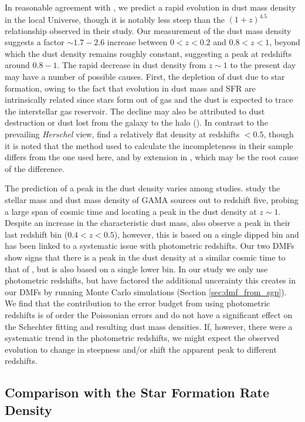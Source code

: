 In reasonable agreement with \citealt{Dunne_2011}, we predict a rapid evolution in dust mass density in the local Universe, though it is notably less steep than the $(1+z)^{4.5}$ relationship observed in their study. Our measurement of the dust mass density suggests a factor $\sim 1.7 - 2.6$ increase between $0 < z < 0.2$ and $0.8 < z < 1$, beyond which the dust density remains roughly constant, suggesting a peak at redshifts around $0.8 - 1$. The rapid decrease in dust density from $z \sim 1$ to the present day may have a number of possible causes. First, the depletion of dust due to star formation, owing to the fact that evolution in dust mass and SFR are intrinsically related since stars form out of gas and the dust is expected to trace the interstellar gas reservoir. The decline may also be attributed to dust destruction or dust lost from the galaxy to the halo (\citealt{Dunne_2011}). In contrast to the prevailing \textit{Herschel} view, \citealt{Driver_2018} find a relatively flat density at redshifts $< 0.5$, though it is noted that the method used to calculate the incompleteness in their sample differs from the one used here, and by extension in \citealt{Dunne_2011}, which may be the root cause of the difference.

The prediction of a peak in the dust density varies among studies. \citealt{Driver_2018} study the stellar mass and dust mass density of GAMA sources out to redshift five, probing a large span of cosmic time and locating a peak in the dust density at $z \sim 1$. Despite an increase in the characteristic dust mass, \citealt{Dunne_2011} also observe a peak in their last redshift bin ($0.4 < z < 0.5$), however, this is based on a single dipped bin and has been linked to a systematic issue with photometric redshifts. Our two DMFs show signs that there is a peak in the dust density at a similar cosmic time to that of \citealt{Driver_2018}, but is also based on a single lower bin. In our study we only use photometric redshifts, but have factored the additional uncerainty this creates in our DMFs by running Monte Carlo simulations (Section \ref{sec:dmf_from_sgp}). We find that the contribution to the error budget from using photometric redshifts is of order the Poissonian errors and do not have a significant effect on the Schechter fitting and resulting dust mass densities. If, however, there were a systematic trend in the photometric redshifts, we might expect the observed evolution to change in steepness and/or shift the apparent peak to different redshifts.

\subsection{Comparison with the Star Formation Rate Density}

